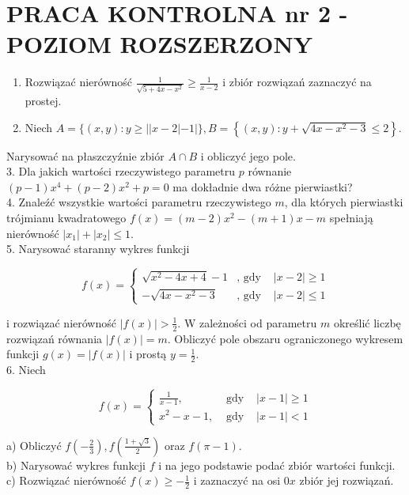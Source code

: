 \documentclass[10pt]{article}
\begin{document}
\section*{PRACA KONTROLNA nr 2 - POZIOM ROZSZERZONY}
\begin{enumerate}
  \item Rozwiązać nierówność $\frac{1}{\sqrt{5+4 x-x^{2}}} \geqslant \frac{1}{x-2}$ i zbiór rozwiązań zaznaczyć na prostej.
  \item Niech $A=\{(x, y): y \geqslant||x-2|-1|\}, B=\left\{(x, y): y+\sqrt{4 x-x^{2}-3} \leqslant 2\right\}$.
\end{enumerate}

Narysować na płaszczyźnie zbiór $A \cap B$ i obliczyć jego pole.\\
3. Dla jakich wartości rzeczywistego parametru $p$ równanie $(p-1) x^{4}+(p-2) x^{2}+p=0$ ma dokładnie dwa różne pierwiastki?\\
4. Znaleźć wszystkie wartości parametru rzeczywistego $m$, dla których pierwiastki trójmianu kwadratowego $f(x)=(m-2) x^{2}-(m+1) x-m$ spełniają nierówność $\left|x_{1}\right|+\left|x_{2}\right| \leqslant 1$.\\
5. Narysować staranny wykres funkcji

$$
f(x)=\left\{\begin{array}{rll}
\sqrt{x^{2}-4 x+4}-1 & , \text { gdy } & |x-2| \geqslant 1 \\
-\sqrt{4 x-x^{2}-3} & , \text { gdy } & |x-2| \leqslant 1
\end{array}\right.
$$

i rozwiązać nierówność $|f(x)|>\frac{1}{2}$. W zależności od parametru $m$ określić liczbę rozwiązań równania $|f(x)|=m$. Obliczyć pole obszaru ograniczonego wykresem funkcji $g(x)=|f(x)|$ i prostą $y=\frac{1}{2}$.\\
6. Niech

$$
f(x)=\left\{\begin{array}{lll}
\frac{1}{x-1}, & \text { gdy } & |x-1| \geqslant 1 \\
x^{2}-x-1, & \text { gdy } & |x-1|<1
\end{array}\right.
$$

a) Obliczyć $f\left(-\frac{2}{3}\right), f\left(\frac{1+\sqrt{3}}{2}\right)$ oraz $f(\pi-1)$.\\
b) Narysować wykres funkcji $f$ i na jego podstawie podać zbiór wartości funkcji.\\
c) Rozwiązać nierówność $f(x) \geqslant-\frac{1}{2}$ i zaznaczyć na osi $0 x$ zbiór jej rozwiązań.
\end{document}
